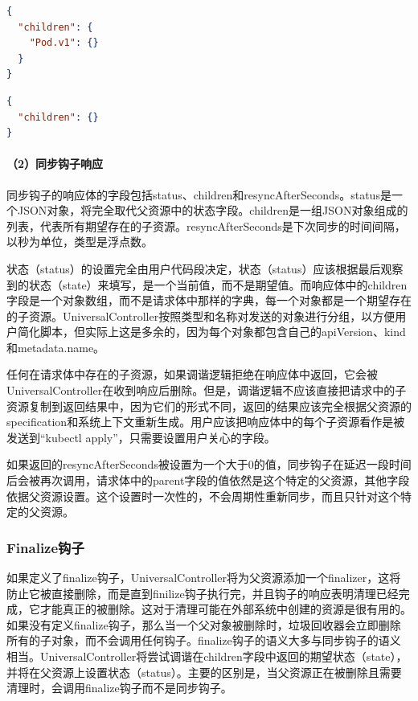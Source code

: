 \documentclass[macfonts,master]{njuthesis}
\begin{document}
\begin{lstlisting}[language=json,caption=请求体,label=listing:children-pod]
{
  "children": {
    "Pod.v1": {}
  }
}
\end{lstlisting}

\begin{lstlisting}[language=json,caption=异常请求体,label=listing:children]
{
  "children": {}
}
\end{lstlisting}

\paragraph{（2）同步钩子响应}
同步钩子的响应体的字段包括status、children和resyncAfterSeconds。status是一个JSON对象，将完全取代父资源中的状态字段。children是一组JSON对象组成的列表，代表所有期望存在的子资源。resyncAfterSeconds是下次同步的时间间隔，以秒为单位，类型是浮点数。

状态（status）的设置完全由用户代码段决定，状态（status）应该根据最后观察到的状态（state）来填写，是一个当前值，而不是期望值。而响应体中的children字段是一个对象数组，而不是请求体中那样的字典，每一个对象都是一个期望存在的子资源。UniversalController按照类型和名称对发送的对象进行分组，以方便用户简化脚本，但实际上这是多余的，因为每个对象都包含自己的apiVersion、kind和metadata.name。

任何在请求体中存在的子资源，如果调谐逻辑拒绝在响应体中返回，它会被UniversalController在收到响应后删除。但是，调谐逻辑不应该直接把请求中的子资源复制到返回结果中，因为它们的形式不同，返回的结果应该完全根据父资源的specification和系统上下文重新生成。用户应该把响应体中的每个子资源看作是被发送到``kubectl apply''，只需要设置用户关心的字段。

如果返回的resyncAfterSeconds被设置为一个大于0的值，同步钩子在延迟一段时间后会被再次调用，请求体中的parent字段的值依然是这个特定的父资源，其他字段依据父资源设置。这个设置时一次性的，不会周期性重新同步，而且只针对这个特定的父资源。

\subsubsection{Finalize钩子}
如果定义了finalize钩子，UniversalController将为父资源添加一个finalizer，这将防止它被直接删除，而是直到finilize钩子执行完，并且钩子的响应表明清理已经完成，它才能真正的被删除。这对于清理可能在外部系统中创建的资源是很有用的。如果没有定义finalize钩子，那么当一个父对象被删除时，垃圾回收器会立即删除所有的子对象，而不会调用任何钩子。finalize钩子的语义大多与同步钩子的语义相当。UniversalController将尝试调谐在children字段中返回的期望状态（state），并将在父资源上设置状态（status）。主要的区别是，当父资源正在被删除且需要清理时，会调用finalize钩子而不是同步钩子。
\end{document}
